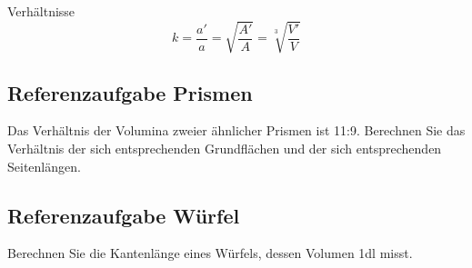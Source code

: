 \begin{bemerkung}{Verhältnisse}{}
  $$k = \frac{a'}{a} = \sqrt{\frac{A'}{A}} = \sqrt[3\,\,\,]{\frac{V'}{V}}$$
\end{bemerkung}
\newpage


\subsection{Referenzaufgabe Prismen}
Das Verhältnis der Volumina zweier ähnlicher Prismen ist
11:9. Berechnen Sie das Verhältnis der sich entsprechenden Grundflächen und
der sich entsprechenden Seitenlängen.


\subsection{Referenzaufgabe Würfel}
Berechnen Sie die Kantenlänge eines Würfels, dessen Volumen 1dl misst.

\newpage
